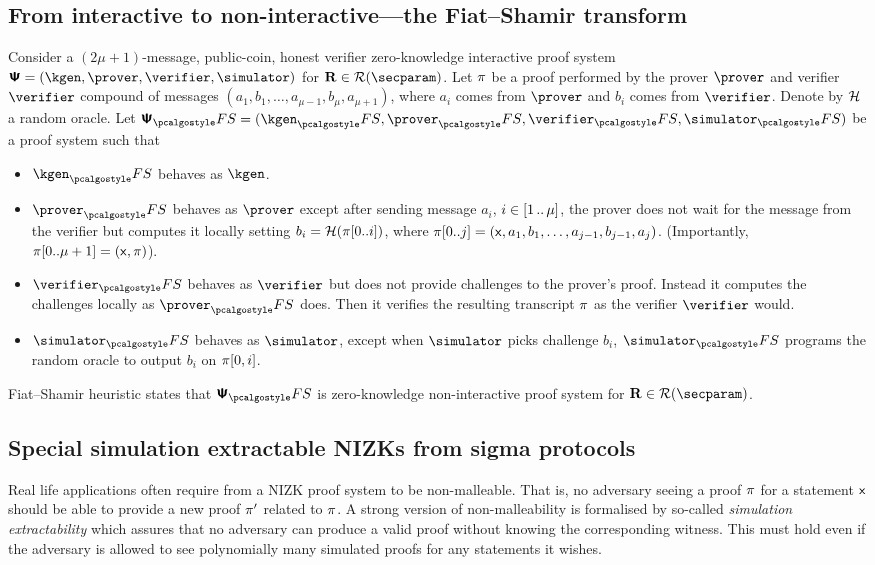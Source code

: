 \documentclass[runningheads,11pt]{llncs}
\begin{document}
\subsection{From interactive to non-interactive---the Fiat--Shamir transform}
Consider a $(2\mu + 1)$-message, public-coin, honest verifier zero-knowledge
interactive proof system
$\proofsystem = (\kgen, \prover, \verifier, \simulator)$ for
$\REL \in \RELGEN(\secparam)$.  Let $\pi$ be a proof performed by the
prover $\prover$ and verifier $\verifier$ compound of messages
$(a_1, b_1, \ldots, a_{\mu - 1}, b_{\mu}, a_{\mu + 1})$, where $a_i$ comes from
$\prover$ and $b_i$ comes from $\verifier$.  Denote by $\mathcal{H}$ a random oracle.
Let $\proofsystem_\fs = (\kgen_\fs, \prover_\fs, \verifier_\fs, \simulator_\fs)$
be a proof system such that
\begin{itemize}
  \item $\kgen_\fs$ behaves as $\kgen$.
  \item $\prover_\fs$ behaves as $\prover$ except after sending message
    $a_i$, $i \in [1 \, .. \, \mu]$, the prover does not wait for
    the message from the verifier but computes it locally setting $b_i
    = \mathcal{H}(\pi[0..i])$, where $\pi[0..j] = (\mathsf{x}, a_1, b_1, \ldots,
    a_{j - 1}, b_{j - 1}, a_j)$. (Importantly, $\pi[0..\mu + 1] =
    (\mathsf{x}, \pi)$).
  \item $\verifier_\fs$ behaves as $\verifier$ but does not provide
    challenges to the prover's proof. Instead it computes the
    challenges locally as $\prover_\fs$ does. Then it verifies the
    resulting transcript $\pi$ as the verifier $\verifier$ would. 
  \item $\simulator_\fs$ behaves as $\simulator$, except when
    $\simulator$ picks challenge $b_i$, $\simulator_\fs$ programs the
    random oracle to output $b_i$ on $\pi[0, i]$.
  \end{itemize}

Fiat--Shamir heuristic states that $\proofsystem_\fs$ is zero-knowledge
non-interactive proof system for $\REL \in \RELGEN(\secparam)$.

\subsection{Special simulation extractable NIZKs from sigma protocols}
\label{sec:simext_def}
Real life applications often require from a NIZK proof system to be
non-malleable. That is, no adversary seeing a proof $\pi$ for a statement
$\mathsf{x}$ should be able to provide a new proof $\pi'$ related to $\pi$.
A strong version of non-malleability is formalised by so-called \emph{simulation extractability}
which assures that no adversary can produce a valid proof without knowing the
corresponding witness. This must hold even if the adversary is allowed to see
polynomially many simulated proofs for any statements it wishes.
\end{document}
